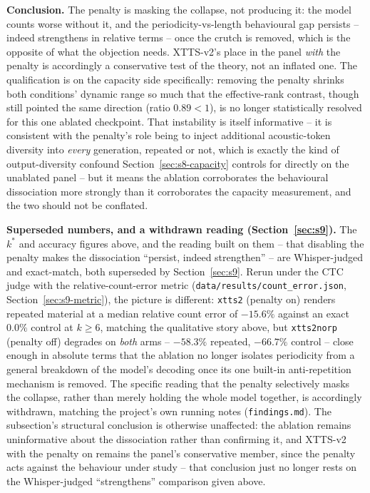 \documentclass[11pt]{article}
\begin{document}
\textbf{Conclusion.} The penalty is masking the collapse, not producing it:
the model counts worse without it, and the periodicity-vs-length behavioural
gap persists -- indeed strengthens in relative terms -- once the crutch is
removed, which is the opposite of what the objection needs. XTTS-v2's place
in the panel \emph{with} the penalty is accordingly a conservative test of the
theory, not an inflated one. The qualification is on the capacity side
specifically: removing the penalty shrinks both conditions' dynamic range so
much that the effective-rank contrast, though still pointed the same
direction (ratio $0.89 < 1$), is no longer statistically resolved for this one
ablated checkpoint. That instability is itself informative -- it is consistent
with the penalty's role being to inject additional acoustic-token diversity
into \emph{every} generation, repeated or not, which is exactly the kind of
output-diversity confound Section~\ref{sec:s8-capacity} controls for
directly on the unablated panel -- but it means the ablation corroborates the
behavioural dissociation more strongly than it corroborates the capacity
measurement, and the two should not be conflated.

\noindent\textbf{Superseded numbers, and a withdrawn reading
(Section~\ref{sec:s9}).} The $k^\ast$ and accuracy figures above, and the
reading built on them -- that disabling the penalty makes the dissociation
``persist, indeed strengthen'' -- are Whisper-judged and exact-match, both
superseded by Section~\ref{sec:s9}. Rerun under the CTC judge with the
relative-count-error metric (\texttt{data/results/count\_error.json},
Section~\ref{sec:s9-metric}), the picture is different: \texttt{xtts2}
(penalty on) renders repeated material at a median relative count error of
$-15.6\%$ against an exact $0.0\%$ control at $k\ge6$, matching the
qualitative story above, but \texttt{xtts2norp} (penalty off) degrades on
\emph{both} arms -- $-58.3\%$ repeated, $-66.7\%$ control -- close enough in
absolute terms that the ablation no longer isolates periodicity from a
general breakdown of the model's decoding once its one built-in
anti-repetition mechanism is removed. The specific reading that the penalty
selectively masks the collapse, rather than merely holding the whole model
together, is accordingly withdrawn, matching the project's own running notes
(\texttt{findings.md}). The subsection's structural conclusion is otherwise
unaffected: the ablation remains uninformative about the dissociation rather
than confirming it, and XTTS-v2 with the penalty on remains the panel's
conservative member, since the penalty acts against the behaviour under
study -- that conclusion just no longer rests on the Whisper-judged
``strengthens'' comparison given above.
\end{document}
